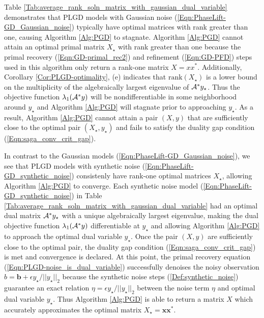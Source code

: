 Table \ref{Tab:average_rank_soln_matrix_with_gaussian_dual_variable} demonstrates that PLGD models with Gaussian noise (\ref{Eqn:PhaseLift-GD_Gaussian_noise}) typically have optimal matrices with rank greater than one, causing Algorithm \ref{Alg:PGD} to stagnate.  
Algorithm \ref{Alg:PGD} cannot attain an optimal primal matrix $X_\star$ with rank greater than one because the primal recovery (\ref{Eqn:GD-primal_rec2}) and refinement (\ref{Eqn:GD-PFD}) steps used in this algorithm only return a rank-one matrix $X = xx^*$.  
Additionally, Corollary \ref{Cor:PLGD-optimality}, (e) indicates that $\text{rank}(X_\star)$ is a lower bound on the multiplicity of the algebraically largest eigenvalue of ${\mathcal A}^*y_\star$.  
Thus the objective function $\lambda_1({\mathcal A}^*y)$ will be nondifferentiable in some neighborhood around $y_\star$ and Algorithm \ref{Alg:PGD} will stagnate prior to approaching $y_\star$.  
As a result, Algorithm \ref{Alg:PGD} cannot attain a pair $(X,y)$ that are sufficiently close to the optimal pair $(X_\star, y_\star)$ and fails to satisfy the duality gap condition (\ref{Eqn:saga_conv_crit_gap}).


In contrast to the Gaussian models (\ref{Eqn:PhaseLift-GD_Gaussian_noise}), we see that PLGD models with synthetic noise (\ref{Eqn:PhaseLift-GD_synthetic_noise}) consistenly have rank-one optimal matrices $X_\star$, allowing Algorithm \ref{Alg:PGD} to converge.  
Each synthetic noise model (\ref{Eqn:PhaseLift-GD_synthetic_noise}) in Table \ref{Tab:average_rank_soln_matrix_with_gaussian_dual_variable} had an optimal dual matrix ${\mathcal A}^*y_\star$ with a unique algebraically largest eigenvalue, making the dual objective function $\lambda_1({\mathcal A}^*y)$ differentiable at $y_\star$ and allowing Algorithm \ref{Alg:PGD} to approach the optimal dual variable $y_\star$.  
Once the pair $(X,y)$ are sufficiently close to the optimal pair, the duality gap condition (\ref{Eqn:saga_conv_crit_gap}) is met and convergence is declared.
At this point, the primal recovery equation (\ref{Eqn:PLGD-noise_is_dual_variable}) successfully denoises the noisy observation $b = \mathbf{b} + \epsilon y_\star / ||y_\star||_2$ because the synthetic noise steps (\ref{Def:synthetic_noise}) guarantee an exact relation $\eta = \epsilon y_\star / ||y_\star||_2$ between the noise term $\eta$ and optimal dual variable $y_\star$.
Thus Algorithm \ref{Alg:PGD} is able to return a matrix $X$ which accurately approximates the optimal matrix $X_\star = \mathbf{x}\mathbf{x}^*$.  










